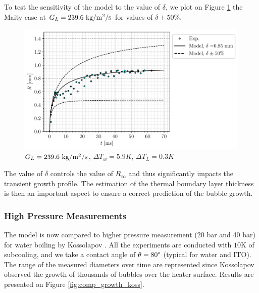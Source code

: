 To test the sensitivity of the model to the value of $\delta$, we plot on Figure \ref{fig:growth_newmod_sensi} the Maity case at $G_{L}=239.6~\text{kg/m$^{2}$/s}$ for values of $\delta \pm 50\%$.

\begin{figure}[!h]
\centering
\includegraphics[width=0.6\linewidth]{img/growth/SH5.9_SC0.3_V0.25_sensidelta.pdf}
\caption{$G_{L}=239.6~ \text{kg/m$^{2}$/s}$, $\Delta T_{w}=5.9K$, $\Delta T_{L}=0.3K$}
\label{fig:growth_newmod_sensi}
\end{figure}

\npar

The value of $\delta$ controls the value of $R_{\infty}$ and thus significantly impacts the transient growth profile. The estimation of the thermal boundary layer thickness is then an important aspect to ensure a correct prediction of the bubble growth.

\subsubsection{High Pressure Measurements}

The model is now compared to higher pressure measurement (20 bar and 40 bar) for water boiling by Kossolapov \cite{kossolapov_experimental_2021}. All the experiments are conducted with $10$K of subcooling, and we take a contact angle of $\theta=80\degree$ (typical for water and ITO). The range of the measured diameters over time are represented since Kossolapov observed the growth of thousands of bubbles over the heater surface. Results are presented on Figure \ref{fig:comp_growth_koss}.



